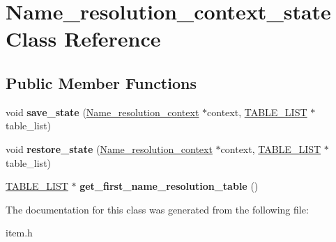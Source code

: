 \hypertarget{className__resolution__context__state}{}\section{Name\+\_\+resolution\+\_\+context\+\_\+state Class Reference}
\label{className__resolution__context__state}
\subsection*{Public Member Functions}
\begin{DoxyCompactItemize}
\item 
\mbox{\label{className__resolution__context__state_a6f7476518ab6df5f730e1d99e0cf6a76}} 
void {\bfseries save\+\_\+state} (\mbox{\hyperlink{structName__resolution__context}{Name\+\_\+resolution\+\_\+context}} $\ast$context, \mbox{\hyperlink{structTABLE__LIST}{T\+A\+B\+L\+E\+\_\+\+L\+I\+ST}} $\ast$table\+\_\+list)
\item 
\mbox{\label{className__resolution__context__state_a3f89001b222088828c3e876655cf8f4e}} 
void {\bfseries restore\+\_\+state} (\mbox{\hyperlink{structName__resolution__context}{Name\+\_\+resolution\+\_\+context}} $\ast$context, \mbox{\hyperlink{structTABLE__LIST}{T\+A\+B\+L\+E\+\_\+\+L\+I\+ST}} $\ast$table\+\_\+list)
\item 
\mbox{\label{className__resolution__context__state_ade51dade97350f6b5a72c752ba911281}} 
\mbox{\hyperlink{structTABLE__LIST}{T\+A\+B\+L\+E\+\_\+\+L\+I\+ST}} $\ast$ {\bfseries get\+\_\+first\+\_\+name\+\_\+resolution\+\_\+table} ()
\end{DoxyCompactItemize}


The documentation for this class was generated from the following file\+:\begin{DoxyCompactItemize}
\item 
item.\+h\end{DoxyCompactItemize}
